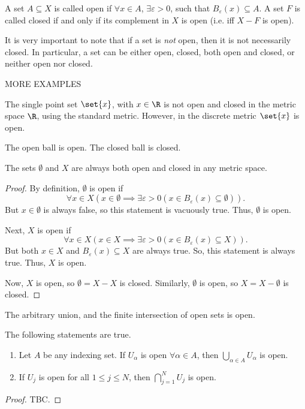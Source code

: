 \documentclass[draft]{penrose}
\newcommand{\oB}{B}
\begin{document}
\begin{ndfn}
  A set $A \subseteq X$ is called open if $\forall x \in A$, $\exists \varepsilon > 0$, such that $\oB_{\varepsilon}(x) \subseteq A$. A set $F$ is called closed if and only if its complement in $X$ is open (i.e. iff $X-F$ is open).
\end{ndfn}
It is very important to note that if a set is \emph{not} open, then it is not necessarily closed. In particular, a set can be either open, closed, both open and closed, or neither open nor closed.

MORE EXAMPLES

\begin{negg}
  The single point set $\set{x}$, with $x\in\R$ is not open and closed in the metric space $\R$, using the standard metric. However, in the discrete metric $\set{x}$ is open.
\end{negg}

\begin{nlemma}
  The open ball is open. The closed ball is closed.
\end{nlemma}

\begin{nthm}
  The sets $\emptyset$ and $X$ are always both open and closed in any metric space.
\end{nthm}
\begin{proof}
  By definition, $\emptyset$ is open if
  \begin{equation*}
    \forall x \in X \left(x \in \emptyset \implies \exists\varepsilon>0 (x \in B_{\varepsilon}(x) \subseteq \emptyset)\right).
  \end{equation*}
  But $x \in \emptyset$ is always false, so this statement is vacuously true. Thus, $\emptyset$ is open.

  Next, $X$ is open if
  \begin{equation*}
    \forall x \in X \left(x \in X \implies \exists\varepsilon>0 (x \in B_{\varepsilon}(x) \subseteq X)\right).
  \end{equation*}
  But both $x \in X$ and $B_{\varepsilon}(x) \subseteq X$ are always true. So, this statement is always true. Thus, $X$ is open.

  Now, $X$ is open, so $\emptyset = X-X$ is closed. Similarly, $\emptyset$ is open, so $X = X-\emptyset$ is closed.
\end{proof}

The arbitrary union, and the finite intersection of open sets is open.
\begin{nthm}
  The following statements are true.
  \begin{enumerate}
  \item Let $A$ be any indexing set. If $U_{\alpha}$ is open $\forall\alpha\in A$, then $\bigcup_{\alpha\in A} U_{\alpha}$ is open.
  \item If $U_{j}$ is open for all $1 \leq j \leq N$, then $\bigcap_{j=1}^{N} U_{j}$ is open.
  \end{enumerate}
\end{nthm}
\begin{proof}
  TBC.
\end{proof}
\end{document}
